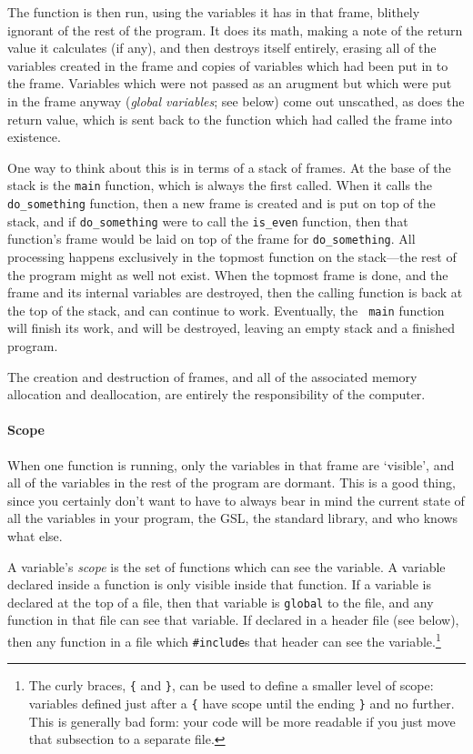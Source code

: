 \documentclass[12pt]{article}
\begin{document}
The function is then run, using the variables it has in that frame,
blithely ignorant of the rest of the program. It does its math, making a
note of the return value it calculates (if any), and then destroys itself
entirely, erasing all of the variables created in the frame and copies
of variables which had been put in to the frame. Variables which were not
passed as an arugment but which were put in the frame anyway ({\sl global
variables}; see below) come out unscathed, as does the return value, which
is sent back to the function which had called the frame into existence.

One way to think about this is in terms of a stack of frames. At the
base of the stack is the {\tt main} function, which is always the first
called. When it calls the {\tt do\_something} function, then a new frame
is created and is put on top of the stack, and if {\tt do\_something}
were to call the {\tt is\_even} function, then that function's frame would be laid on top
of the frame for {\tt do\_something}. All processing happens exclusively in
the topmost function on the stack---the rest of the program might as
well not exist. When the topmost frame is done, and the frame and its
internal variables are destroyed, then the calling function is back at
the top of the stack, and can continue to work. Eventually, the {\tt
main} function will finish its work, and will be destroyed, leaving an
empty stack and a finished program.

The creation and destruction of frames, and all of the associated
memory allocation and deallocation, are entirely the responsibility of
the computer.   

\paragraph{Scope}	\label{scope}

When one function is running, only the variables in that frame are
`visible', and all of the variables in the rest of the program are 
dormant.  This is a good thing, since you certainly don't want to have
to always bear in mind the current state of  all the variables in your program,
the GSL, the standard library, and who knows what else.

A variable's {\sl scope} is the set of functions which can see the
variable. A variable declared inside a function is only visible inside
that function.  If a variable is declared at the top of a file, then
that variable is {\tt global} to the file, and any function in that
file can see that variable. If declared in a header file (see below),
then any function in a file which {\tt \#include}s that header  can see
the variable.\footnote{The curly braces, {\tt \{} and {\tt \}}, can be
used to define a smaller level of scope: variables defined just after a
{\tt \{} have scope until the ending {\tt \}} and no further. This is
generally bad form: your code will be more readable if you just move
that subsection to a separate file.}
\end{document}
